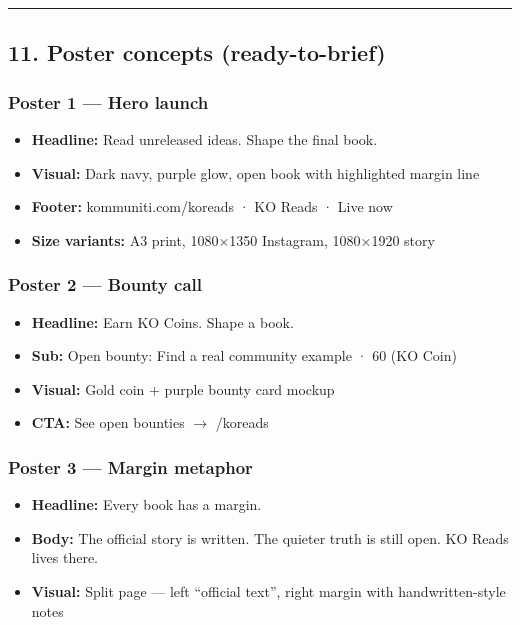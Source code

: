 \documentclass[11pt,a4paper]{report}
\begin{document}
\medskip\hrule\medskip

\subsection{11. Poster concepts (ready-to-brief)}

\subsubsection{Poster 1 --- Hero launch}
\begin{itemize}
  \item \textbf{Headline:} Read unreleased ideas. Shape the final book.
  \item \textbf{Visual:} Dark navy, purple glow, open book with highlighted margin line
  \item \textbf{Footer:} kommuniti.com/koreads · KO Reads · Live now
  \item \textbf{Size variants:} A3 print, 1080×1350 Instagram, 1080×1920 story
\end{itemize}

\subsubsection{Poster 2 --- Bounty call}
\begin{itemize}
  \item \textbf{Headline:} Earn KO Coins. Shape a book.
  \item \textbf{Sub:} Open bounty: Find a real community example · 60 (KO Coin)
  \item \textbf{Visual:} Gold coin + purple bounty card mockup
  \item \textbf{CTA:} See open bounties $\rightarrow$ /koreads
\end{itemize}

\subsubsection{Poster 3 --- Margin metaphor}
\begin{itemize}
  \item \textbf{Headline:} Every book has a margin.
  \item \textbf{Body:} The official story is written. The quieter truth is still open. KO Reads lives there.
  \item \textbf{Visual:} Split page --- left “official text”, right margin with handwritten-style notes
\end{itemize}
\end{document}
